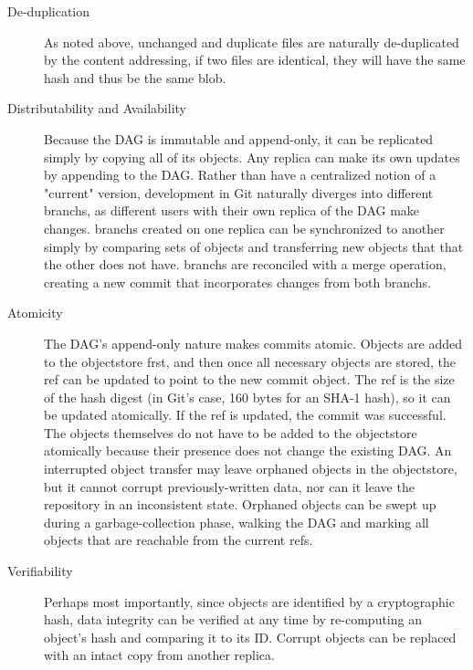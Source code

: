 \begin{description}

    \item[De-duplication] As noted above, unchanged and duplicate files are
        naturally de-duplicated by the content addressing, if two files are
        identical, they will have the same hash and thus be the same \gls{blob}.

    \item[Distributability and Availability] Because the \gls{DAG} is immutable
        and append-only, it can be replicated simply by copying all of its
        objects. Any replica can make its own updates by appending to the
        \gls{DAG}. Rather than have a centralized notion of a "current" version,
        development in Git naturally diverges into different \glspl{branch}, as
        different users with their own replica of the \gls{DAG} make changes.
        \Glspl{branch} created on one replica can be synchronized to another
        simply by comparing sets of objects and transferring new objects that
        that the other does not have. \Glspl{branch} are reconciled with a
        \gls{merge} operation, creating a new \gls{commit} that incorporates
        changes from both \glspl{branch}.

    \item[Atomicity] The \gls{DAG}'s append-only nature makes \glspl{commit}
        atomic. Objects are added to the \gls{objectstore} frst, and then once
        all necessary objects are stored, the \gls{ref} can be updated to point
        to the new \gls{commit} object. The \gls{ref} is the size of the hash
        digest (in Git's case, \num{160} bytes for an SHA-1 hash), so it can be
        updated atomically. If the \gls{ref} is updated, the \gls{commit} was
        successful. The objects themselves do not have to be added to the
        \gls{objectstore} atomically because their presence does not change the
        existing \gls{DAG}. An interrupted object transfer may leave orphaned
        objects in the \gls{objectstore}, but it cannot corrupt
        previously-written data, nor can it leave the \gls{repository} in an
        inconsistent state. Orphaned objects can be swept up during a
        garbage-collection phase, walking the \gls{DAG} and marking all objects
        that are reachable from the current \glspl{ref}.

    \item[Verifiability] Perhaps most importantly, since objects are identified
        by a cryptographic hash, data integrity can be verified at any time by
        re-computing an object's hash and comparing it to its ID. Corrupt
        objects can be replaced with an intact copy from another replica.

\end{description}

